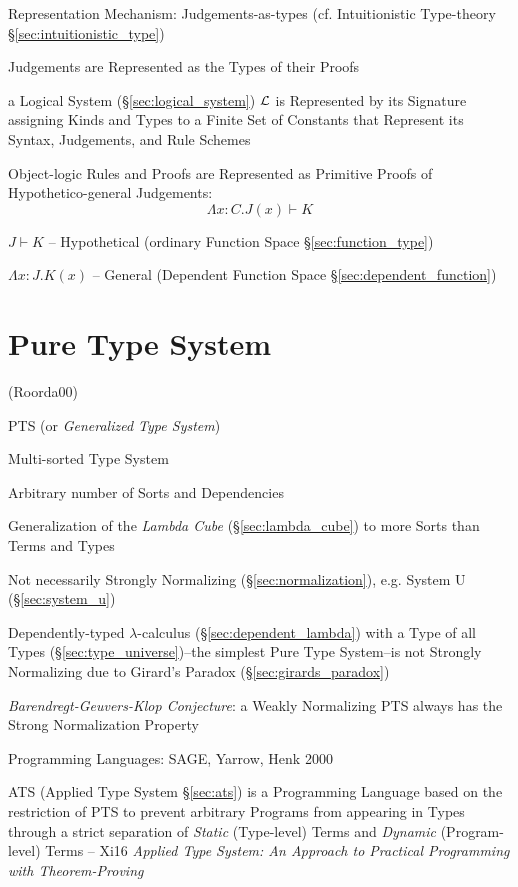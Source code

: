 Representation Mechanism: Judgements-as-types (cf. Intuitionistic
Type-theory \S\ref{sec:intuitionistic_type})

Judgements are Represented as the Types of their Proofs

a Logical System (\S\ref{sec:logical_system}) $\mathcal{L}$ is
Represented by its Signature assigning Kinds and Types to a Finite Set
of Constants that Represent its Syntax, Judgements, and Rule Schemes

Object-logic Rules and Proofs are Represented as Primitive Proofs of
Hypothetico-general Judgements:
\[
  \Lambda x:C.J(x) \vdash K
\]

$J \vdash K$ -- Hypothetical (ordinary Function Space
\S\ref{sec:function_type})

$\Lambda x:J.K(x)$ -- General (Dependent Function Space
\S\ref{sec:dependent_function})



\section{Pure Type System}\label{sec:pts}

(Roorda00) %

PTS (or \emph{Generalized Type System})

Multi-sorted Type System

Arbitrary number of Sorts and Dependencies

Generalization of the \emph{Lambda Cube} (\S\ref{sec:lambda_cube}) to
more Sorts than Terms and Types

Not necessarily Strongly Normalizing (\S\ref{sec:normalization}), e.g.
System U (\S\ref{sec:system_u})

Dependently-typed $\lambda$-calculus (\S\ref{sec:dependent_lambda})
with a Type of all Types (\S\ref{sec:type_universe})--the simplest
Pure Type System--is not Strongly Normalizing due to Girard's Paradox
(\S\ref{sec:girards_paradox})

\emph{Barendregt-Geuvers-Klop Conjecture}: a Weakly Normalizing PTS
always has the Strong Normalization Property

Programming Languages: SAGE, Yarrow, Henk 2000


\fist ATS (Applied Type System \S\ref{sec:ats}) is a Programming
Language based on the restriction of PTS to prevent arbitrary Programs
from appearing in Types through a strict separation of \emph{Static}
(Type-level) Terms and \emph{Dynamic} (Program-level) Terms -- Xi16
\emph{Applied Type System: An Approach to Practical Programming with
  Theorem-Proving}


